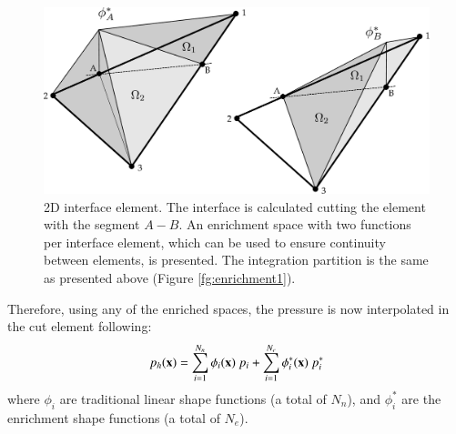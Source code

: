 \begin{figure}[H]
  \centering
   \includegraphics[width=.9\columnwidth]{images/enrichment2.pdf}
   \caption{2D interface element. The interface is calculated cutting the element with the segment $A-B$. An enrichment space with two functions per interface element, which can be used to ensure continuity between elements, is presented. The integration partition is the same as presented above (Figure \ref{fg:enrichment1}).}
   \label{fg:enrichment2}
\end{figure}


Therefore, using any of the enriched spaces, the pressure is now interpolated in the cut element following:
 \begin{equation}
      p_h(\mathbf{x}) = \sum_{i=1}^{N_n} \phi_i(\mathbf{x}) \ p_i + \sum_{i=1}^{N_e} \phi_i^*(\mathbf{x}) \ p_i^*
   \end{equation}
where $\phi_i$ are traditional linear shape functions (a total of $N_n$), and $\phi_i^*$ are the enrichment shape functions (a total of $N_e$).

